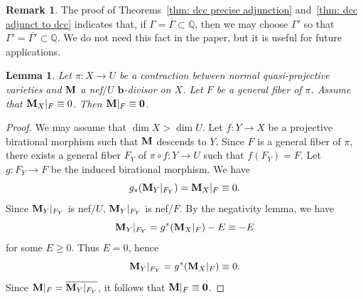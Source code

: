 \documentclass[11pt,reqno]{amsart}
\numberwithin{equation}{section}
\newcommand{\bb}{\bm{b}}
\newcommand{\Mm}{{\bf{M}}}
\newcommand{\Ii}{\Gamma}
\newtheorem{lem}[thm]{Lemma}
\theoremstyle{definition}
\newtheorem{rem}[thm]{Remark}
\begin{document}
\begin{rem}
The proof of Theorems~\ref{thm: dcc precise adjunction} and~\ref{thm: dcc adjunct to dcc} indicates that, if $\Ii=\overline{\Ii}\subset\mathbb Q$, then we may choose $\Ii'$ so that $\Ii'=\overline{\Ii'}\subset\mathbb Q$. We do not need this fact in the paper, but it is useful for future applications.
\end{rem}

\begin{lem}\label{lem: non-trivial of b-divisors}
Let $\pi: X\rightarrow U$ be a contraction between normal quasi-projective varieties and $\Mm$ a nef$/U$ $\bb$-divisor on $X$. Let $F$ be a general fiber of $\pi$. Assume that $\Mm_X|_F\equiv 0$. Then $\Mm|_F\equiv \bm{0}$. 
\end{lem}
\begin{proof}
We may assume that $\dim X>\dim U$. Let $f: Y\rightarrow X$ be a projective birational morphism such that $\Mm$ descends to $Y$. Since $F$ is a general fiber of $\pi$, there exists a general fiber $F_Y$ of $\pi\circ f: Y\rightarrow U$ 
such that $f(F_Y)=F$. Let $g: F_Y\rightarrow F$ be the induced birational morphism. We have
$$g_*(\Mm_Y|_{F_Y})=\Mm_X|_F\equiv 0.$$
Since $\Mm_Y|_{F_Y}$ is nef$/U$, $\Mm_Y|_{F_Y}$ is nef$/F$. By the negativity lemma, we have
$$\Mm_Y|_{F_Y}=g^*(\Mm_X|_F)-E\equiv -E$$
for some $E\geq 0$. Thus $E=0$, hence 
$$\Mm_Y|_{F_Y}=g^*(\Mm_X|_F)\equiv 0.$$ 
Since $\Mm|_F=\overline{\Mm_Y|_{F_Y}}$, it follows that $\Mm|_F\equiv\bm{0}$.
\end{proof}
\end{document}
